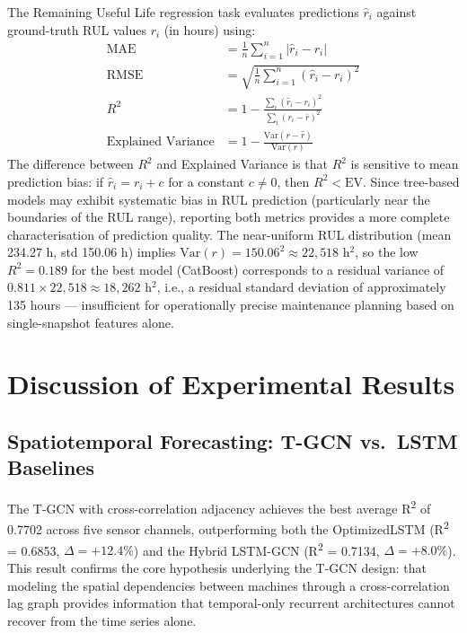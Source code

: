 The Remaining Useful Life regression task evaluates predictions $\hat{r}_i$ against ground-truth RUL values $r_i$ (in hours) using:
\begin{align}
    \text{MAE} &= \frac{1}{n}\sum_{i=1}^{n} |\hat{r}_i - r_i|
    \label{eq:rul_mae} \\[4pt]
    \text{RMSE} &= \sqrt{\frac{1}{n}\sum_{i=1}^{n}(\hat{r}_i - r_i)^2}
    \label{eq:rul_rmse} \\[4pt]
    R^2 &= 1 - \frac{\sum_i (\hat{r}_i - r_i)^2}{\sum_i (r_i - \bar{r})^2}
    \label{eq:rul_r2} \\[4pt]
    \text{Explained Variance} &= 1 - \frac{\text{Var}(r - \hat{r})}{\text{Var}(r)}
    \label{eq:ev}
\end{align}
The difference between $R^2$ and Explained Variance is that $R^2$ is sensitive to mean prediction bias: if $\hat{r}_i = r_i + c$ for a constant $c \neq 0$, then $R^2 < \text{EV}$. Since tree-based models may exhibit systematic bias in RUL prediction (particularly near the boundaries of the RUL range), reporting both metrics provides a more complete characterisation of prediction quality. The near-uniform RUL distribution (mean 234.27 h, std 150.06 h) implies $\text{Var}(r) = 150.06^2 \approx 22{,}518$ h$^2$, so the low $R^2 = 0.189$ for the best model (CatBoost) corresponds to a residual variance of $0.811 \times 22{,}518 \approx 18{,}262$ h$^2$, i.e., a residual standard deviation of approximately 135 hours --- insufficient for operationally precise maintenance planning based on single-snapshot features alone.


\section{Discussion of Experimental Results}

\subsection{Spatiotemporal Forecasting: T-GCN vs.\ LSTM Baselines}

The T-GCN with cross-correlation adjacency achieves the best average R\textsuperscript{2} of 0.7702 across five sensor channels, outperforming both the OptimizedLSTM (R\textsuperscript{2} = 0.6853, $\Delta = +12.4\%$) and the Hybrid LSTM-GCN (R\textsuperscript{2} = 0.7134, $\Delta = +8.0\%$). This result confirms the core hypothesis underlying the T-GCN design: that modeling the spatial dependencies between machines through a cross-correlation lag graph provides information that temporal-only recurrent architectures cannot recover from the time series alone.

